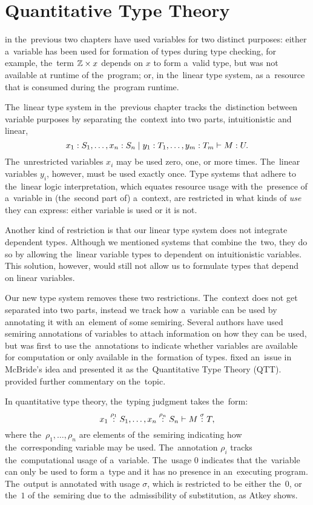 \chapter{Quantitative Type Theory}\label{cha:qtt}

 in the~previous two chapters have used
variables for two distinct purposes: either a~variable has been used for
formation of types during type checking, for example, the~term $\mathbb{Z} \times x$
depends on $x$ to form a~valid type, but was not available at runtime of
the~program; or, in the~linear type system, as a~resource that is consumed
during the~program runtime.

The~linear type system in the~previous chapter tracks the~distinction between
variable purposes by separating the~context into two parts, intuitionistic and
linear,
\[
  x_1 \overset{}: S_1, \dotsc, x_n \overset{}: S_n \mid y_1 \overset{}: T_1, \dotsc, y_m \overset{}: T_m
    \vdash M \overset{}: U.
\]
The~unrestricted variables $x_i$ may be used zero, one, or more times.
The~linear variables $y_i$, however, must be used exactly once. Type systems
that adhere to the~linear logic interpretation, which equates resource usage
with the~presence of a~variable in (the~second part of) a~context, are
restricted in what kinds of \emph{use} they can express: either variable is used
or it is not.

Another kind of restriction is that our linear type system does not integrate
dependent types. Although we mentioned systems that combine the~two, they do so
by allowing the~linear variable types to dependent on intuitionistic variables.
This solution, however, would still not allow us to formulate types that depend
on linear variables.

Our new type system removes these two restrictions. The~context does not get
separated into two parts, instead we track how a~variable can be used by
annotating it with an~element of some semiring. Several authors have used
semiring annotations of variables to attach information on how they can be used,
but \citet{mcbride_2016} was first to use the~annotations to indicate
whether variables are available for computation or only available in
the~formation of types. \citet{atkey_2018} fixed an~issue in McBride's idea and
presented it as the~Quantitative Type Theory (QTT). \citet{weirich_2020}
provided further commentary on the~topic.


In quantitative type theory, the~typing judgment takes the~form:
\[
  x_1 \overset{\rho_1}: S_1, \dotsc, x_n \overset{\rho_n}: S_n \vdash M \overset{\sigma}: T,
\]
where the~$\rho_1, \dotsc, \rho_n$ are elements of the~semiring indicating
how the~corresponding variable may be used. The~annotation $\rho_i$ tracks
the~computational usage of a~variable. The~usage $0$ indicates that the~variable
can only be used to form a~type and it has no presence in an~executing program.
The~output is annotated with usage $\sigma$, which is restricted to be either
the~$0$, or the~$1$ of the~semiring due to the~admissibility of substitution, as
Atkey shows.

